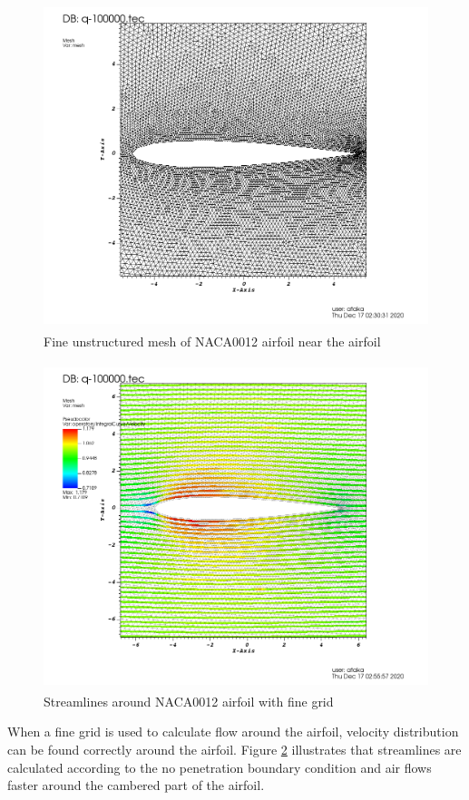 \documentclass[letterpaper,12pt]{article}
\begin{document}
\begin{figure} [!h]
	\centering
	\includegraphics[height = 9.5cm]{graph/fine/fine_209480001.png}
	\caption{Fine unstructured mesh of NACA0012 airfoil near the airfoil}
    \label{fig:airfoilmeshfineclose}
\end{figure}
\begin{figure} [!h]
	\centering
	\includegraphics[height = 9.5cm]{graph/fine/fine_streamline0000.png}
	\caption{Streamlines around NACA0012 airfoil with fine grid}
    \label{fig:airfoilfinestreamline}
\end{figure}

\newpage

When a fine grid is used to calculate flow around the airfoil, velocity distribution
can be found correctly around the airfoil. Figure \ref{fig:airfoilfinestreamline} 
illustrates that streamlines are calculated according to the no penetration boundary 
condition and air flows faster around the cambered part of the airfoil.
\end{document}
